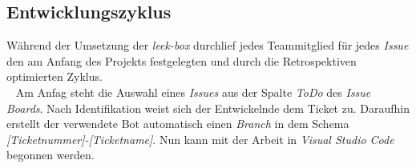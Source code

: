 \documentclass[10pt, a4paper]{article}
\begin{document}
\begin{onehalfspace}
  \subsection{Entwicklungszyklus}
    Während der Umsetzung der \textit{leek-box} durchlief jedes Teammitglied für jedes \textit{Issue} den am Anfang des Projekts festgelegten und
    durch die Retrospektiven optimierten Zyklus.
    \\~
    Am Anfag steht die Auswahl eines \textit{Issues} aus der Spalte \textit{ToDo} des \textit{Issue Boards}.
    Nach Identifikation weist sich der Entwickelnde dem Ticket zu. Daraufhin erstellt der verwendete Bot automatisch einen \textit{Branch}
    in dem Schema \textit{[Ticketnummer]-[Ticketname]}. Nun kann mit der Arbeit in \textit{Visual Studio Code} begonnen werden.

\end{onehalfspace}
\end{document}
